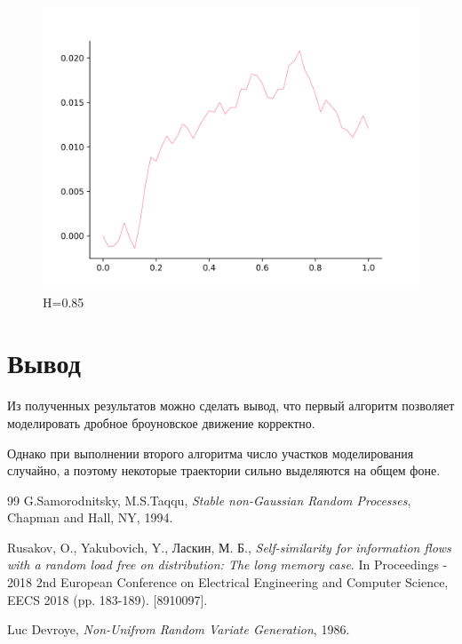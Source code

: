 \documentclass[a4paper,12pt]{article}
\numberwithin{equation}{section}
\begin{document}
	\begin{figure}[H]
		\center
		\includegraphics[scale=0.4]{mean-2-85.png}
		\caption{H=0.85}
	\end{figure}
	
	\section{Вывод}
	
	Из полученных результатов можно сделать вывод, что первый алгоритм позволяет моделировать дробное броуновское движение корректно. 
	
	Однако при выполнении второго алгоритма число участков моделирования случайно, а поэтому некоторые траектории сильно выделяются на общем фоне.
	\newpage
	\begin{thebibliography}	{99}
		 G.Samorodnitsky, M.S.Taqqu,
		\textit{Stable non-Gaussian Random Processes}, Chapman and Hall, NY, 1994.
		
		 Rusakov, O., Yakubovich, Y., Ласкин, М. Б., \textit{Self-similarity for information flows with a random load free on distribution: The long memory case}. In Proceedings - 2018 2nd European Conference on Electrical Engineering and Computer Science, EECS 2018 (pp. 183-189). [8910097]. 
		
		 Luc Devroye, \textit{Non-Unifrom Random Variate Generation}, 1986.
	\end{thebibliography}
\end{document}
